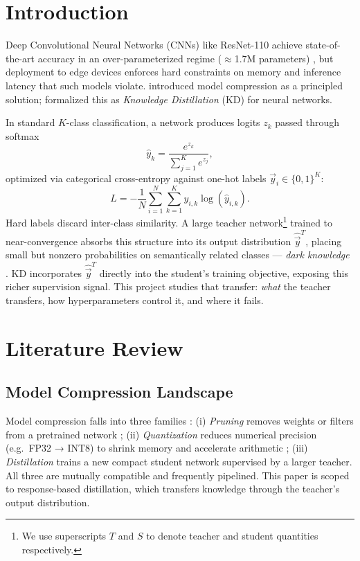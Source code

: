 \documentclass{article}
\theoremstyle{plain}
\theoremstyle{definition}
\theoremstyle{remark}
\begin{document}
\section{Introduction}
\label{sec:intro}
Deep Convolutional Neural Networks (CNNs) like ResNet-110 achieve state-of-the-art accuracy in an over-parameterized regime ($\approx$1.7M parameters) \citep{he2016deep}, but deployment to edge devices enforces hard constraints on memory and inference latency that such models violate. \citet{compression2006} introduced model compression as a principled solution; \citet{hinton2015distilling} formalized this as \emph{Knowledge Distillation} (KD) for neural networks.

In standard $K$-class classification, a network produces logits $z_k$ passed through softmax
\begin{equation}
  \hat{y}_k = \frac{e^{z_k}}{\sum_{j=1}^K e^{z_j}},
  \label{eq:softmax}
\end{equation}
optimized via categorical cross-entropy against one-hot labels $\vec{y}_i \in \{0,1\}^K$:
\begin{equation}
    L = -\frac{1}{N}\sum_{i=1}^N \sum_{k=1}^K y_{i,k} \log(\hat{y}_{i,k}).
    \label{eq:cce}
\end{equation}
Hard labels discard inter-class similarity. A large teacher network\footnote{We use superscripts $T$ and $S$ to denote teacher and student quantities respectively.} trained to near-convergence absorbs this structure into its output distribution $\hat{\vec{y}}^T$, placing small but nonzero probabilities on semantically related classes --- \emph{dark knowledge} \citep{hinton2015distilling}. KD incorporates $\hat{\vec{y}}^T$ directly into the student's training objective, exposing this richer supervision signal. This project studies that transfer: \emph{what} the teacher transfers, how hyperparameters control it, and where it fails.

\section{Literature Review}
\label{sec:litreview}
\subsection{Model Compression Landscape}
\label{sec:compression}

Model compression falls into three families \citep{gou2021knowledge}: (i) \emph{Pruning} removes weights or filters from a pretrained network \citep{cheng2024surveydeepneuralnetwork}; (ii) \emph{Quantization} reduces numerical precision (e.g.\ FP32 → INT8) to shrink memory and accelerate arithmetic \citep{nagel2021whitepaperneuralnetwork}; (iii) \emph{Distillation} trains a new compact student network supervised by a larger teacher. All three are mutually compatible and frequently pipelined. This paper is scoped to response-based distillation, which transfers knowledge through the teacher's output distribution.
\end{document}
